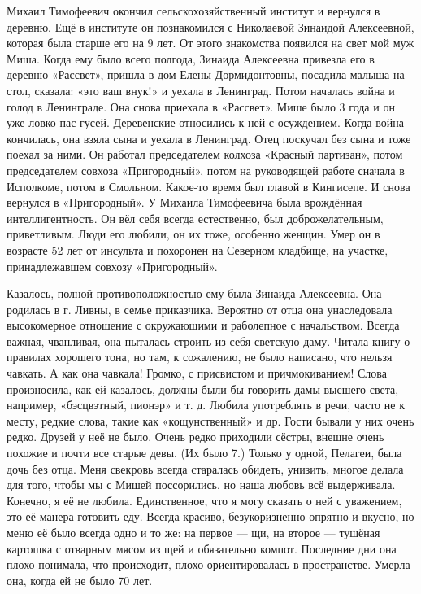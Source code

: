 Михаил Тимофеевич окончил сельскохозяйственный институт и вернулся в деревню.
Ещё в институте он познакомился с Николаевой Зинаидой Алексеевной, которая была старше его на 9 лет.
От этого знакомства появился на свет мой муж Миша.
Когда ему было всего полгода, Зинаида Алексеевна привезла его в деревню «Рассвет», пришла в дом Елены Дормидонтовны, посадила малыша на стол, сказала: «это ваш внук!» и уехала в Ленинград.
Потом началась война и голод в Ленинграде.
Она снова приехала в «Рассвет».
Мише было 3 года и он уже ловко пас гусей.
Деревенские относились к ней с осуждением.
Когда война кончилась, она взяла сына и уехала в Ленинград.
Отец поскучал без сына и тоже поехал за ними.
Он работал  председателем  колхоза «Красный партизан», потом председателем совхоза «Пригородный», потом на руководящей работе сначала в Исполкоме, потом  в Смольном.
Какое-то время был главой в Кингисепе.
И снова вернулся в «Пригородный».
У Михаила Тимофеевича была врождённая интеллигентность.
Он вёл себя всегда естественно, был доброжелательным, приветливым.
Люди его любили, он их тоже, особенно женщин.
Умер он в возрасте 52 лет от инсульта и похоронен на Северном кладбище, на участке, принадлежавшем совхозу «Пригородный».

Казалось, полной противоположностью ему была Зинаида Алексеевна.
Она родилась в г. Ливны, в семье приказчика.
Вероятно от отца она унаследовала высокомерное отношение с окружающими и раболепное с начальством.
Всегда  важная, чванливая, она пыталась строить из себя светскую даму.
Читала книгу о правилах хорошего тона, но там, к сожалению, не было написано, что нельзя чавкать.
А как она чавкала!
Громко, с присвистом и причмокиванием!
Слова произносила, как ей казалось, должны были бы говорить дамы высшего света, например, «бэсцвэтный, пионэр» и т. д.
Любила употреблять в речи, часто не к месту, редкие слова, такие как «кощунственный» и др.
Гости бывали у них очень редко.
Друзей у неё не было.
Очень редко приходили сёстры, внешне очень похожие и почти все старые девы.
(Их было 7.)
Только у одной, Пелагеи, была дочь без отца.
Меня свекровь всегда старалась обидеть, унизить, многое делала для того, чтобы мы с Мишей поссорились, но наша любовь всё выдерживала.
Конечно, я её не любила.
Единственное, что я могу сказать о ней с уважением, это её манера готовить еду.
Всегда красиво, безукоризненно опрятно и вкусно, но меню её было всегда одно и то же: на первое --- щи, на второе --- тушёная картошка с отварным мясом из щей и обязательно компот.
Последние дни она плохо понимала, что происходит, плохо ориентировалась в пространстве.
Умерла она, когда ей не было 70 лет.

